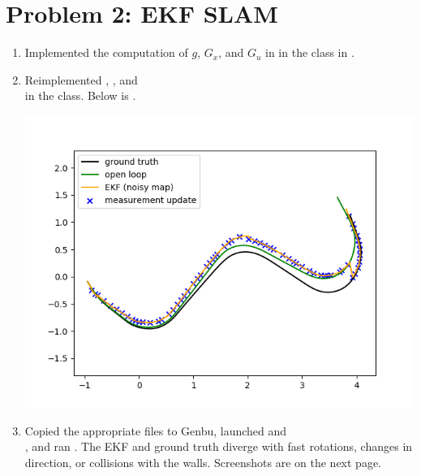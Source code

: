 \documentclass{article}
\begin{document}
\section*{Problem 2: EKF SLAM}
\begin{enumerate}[label=(\roman*)]
\item Implemented the computation of $g$, $G_x$, and $G_u$ in  in the  class in .
\item Reimplemented , , and \\  in the  class. Below is .

\includegraphics[width=\textwidth]{ekf_slam.png}

\item Copied the appropriate files to Genbu, launched  and \\ , and ran . The EKF and ground truth diverge with fast rotations, changes in direction, or collisions with the walls. Screenshots are on the next page.


\end{enumerate}
\end{document}

